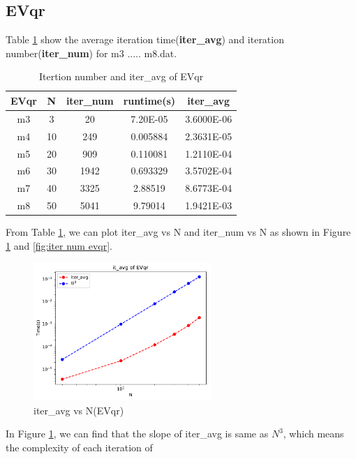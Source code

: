 \documentclass{article}
\begin{document}
\subsection{EVqr}
\label{sec:evqr}
Table \ref{tab:iter evqr} show the average iteration time(\textbf{iter\_avg}) and iteration number(\textbf{iter\_num})
for m3 ..... m8.dat.
\begin{table}[H]
    \begin{center}
        \begin{tabular}{|c|c|c|c|c|}
            \hline
            EVqr & N & iter\_num & runtime(s) & iter\_avg \\ \hline
            m3 & 3 & 20 & 7.20E-05 & 3.6000E-06 \\ \hline
            m4 & 10 & 249 & 0.005884 & 2.3631E-05 \\ \hline
            m5 & 20 & 909 & 0.110081 & 1.2110E-04 \\ \hline
            m6 & 30 & 1942 & 0.693329 & 3.5702E-04 \\ \hline
            m7 & 40 & 3325 & 2.88519 & 8.6773E-04 \\ \hline
            m8 & 50 & 5041 & 9.79014 & 1.9421E-03 \\ \hline
        \end{tabular}
    \end{center}
    \caption{Itertion number and iter\_avg of EVqr}
    \label{tab:iter evqr}
\end{table}
From Table \ref{tab:iter evqr}, we can plot iter\_avg vs N and iter\_num vs N as shown in Figure \ref{fig:iter avg evqr} and \ref{fig:iter num evqr}.
\begin{figure}[H]
    \centering
    \includegraphics[width=0.6\textwidth]{src/iter_avg_unshifted.pdf}
    \caption{iter\_avg vs N(EVqr)}
    \label{fig:iter avg evqr}
\end{figure}
In Figure \ref{fig:iter avg evqr}, we can find that the slope of iter\_avg is same as $N^3$, which means the complexity of each iteration of
\end{document}
